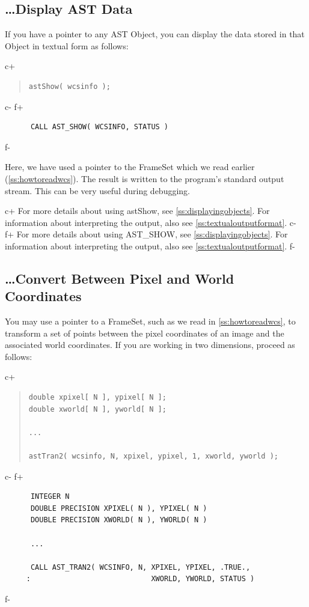 \documentclass[twoside,11pt]{article}
\newcommand{\secref}[1]{\S\ref{#1}}
\renewcommand{\secref}[1]{\ref{#1}}
\begin{document}
\subsection{\ldots Display AST Data}

If you have a pointer to any AST Object, you can display the data
stored in that Object in textual form as follows:

c+
\begin{quote}
\small
\begin{verbatim}
astShow( wcsinfo );
\end{verbatim}
\normalsize
\end{quote}
c-
f+
\small
\begin{verbatim}
      CALL AST_SHOW( WCSINFO, STATUS )
\end{verbatim}
\normalsize
f-

Here, we have used a pointer to the FrameSet which we read earlier
(\secref{ss:howtoreadwcs}).  The result is written to the program's
standard output stream. This can be very useful during debugging.

c+
For more details about using astShow, see
\secref{ss:displayingobjects}. For information about interpreting the
output, also see \secref{ss:textualoutputformat}.
c-
f+
For more details about using AST\_SHOW, see
\secref{ss:displayingobjects}. For information about interpreting the
output, also see \secref{ss:textualoutputformat}.
f-

\subsection{\label{ss:howtotransform}\ldots Convert Between Pixel and World Coordinates}

You may use a pointer to a FrameSet, such as we read in
\secref{ss:howtoreadwcs}, to transform a set of points between the
pixel coordinates of an image and the associated world coordinates. If
you are working in two dimensions, proceed as follows:

c+
\begin{quote}
\small
\begin{verbatim}
double xpixel[ N ], ypixel[ N ];
double xworld[ N ], yworld[ N ];

...

astTran2( wcsinfo, N, xpixel, ypixel, 1, xworld, yworld );
\end{verbatim}
\normalsize
\end{quote}
c-
f+
\small
\begin{verbatim}
      INTEGER N
      DOUBLE PRECISION XPIXEL( N ), YPIXEL( N )
      DOUBLE PRECISION XWORLD( N ), YWORLD( N )

      ...

      CALL AST_TRAN2( WCSINFO, N, XPIXEL, YPIXEL, .TRUE.,
     :                            XWORLD, YWORLD, STATUS )
\end{verbatim}
\normalsize
f-
\end{document}
